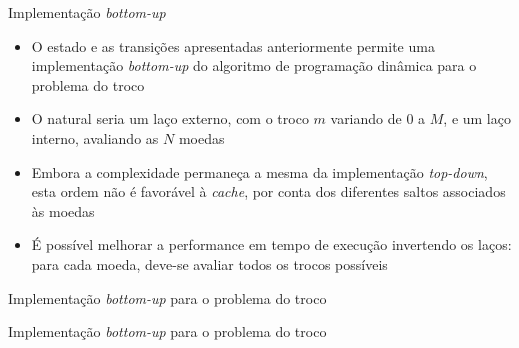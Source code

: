 \begin{frame}[fragile]{Implementação {\it bottom-up}}

    \begin{itemize}
        \item O estado e as transições apresentadas anteriormente permite uma implementação
            \textit{bottom-up} do algoritmo de programação dinâmica para o problema do troco

        \item O natural seria um laço externo, com o troco $m$ variando de $0$ a $M$, e um laço
            interno, avaliando as $N$ moedas

        \item Embora a complexidade permaneça a mesma da implementação \textit{top-down}, esta
            ordem não é favorável à \textit{cache}, por conta dos diferentes saltos associados
            às moedas

        \item É possível melhorar a performance em tempo de execução invertendo os laços: para
            cada moeda, deve-se avaliar todos os trocos possíveis
    \end{itemize}

\end{frame}

\begin{frame}[fragile]{Implementação {\it bottom-up} para o problema do troco}
\end{frame}

\begin{frame}[fragile]{Implementação {\it bottom-up} para o problema do troco}
\end{frame}




